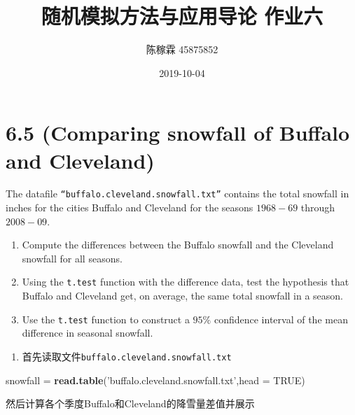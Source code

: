 \documentclass[]{article}
\title{随机模拟方法与应用导论 作业六}
\author{陈稼霖 45875852}
\date{2019-10-04}
\newenvironment{Shaded}{\begin{snugshade}}{\end{snugshade}}
\newcommand{\DataTypeTok}[1]{\textcolor[rgb]{0.13,0.29,0.53}{#1}}
\newcommand{\DecValTok}[1]{\textcolor[rgb]{0.00,0.00,0.81}{#1}}
\newcommand{\KeywordTok}[1]{\textcolor[rgb]{0.13,0.29,0.53}{\textbf{#1}}}
\newcommand{\NormalTok}[1]{#1}
\newcommand{\OperatorTok}[1]{\textcolor[rgb]{0.81,0.36,0.00}{\textbf{#1}}}
\newcommand{\OtherTok}[1]{\textcolor[rgb]{0.56,0.35,0.01}{#1}}
\newcommand{\StringTok}[1]{\textcolor[rgb]{0.31,0.60,0.02}{#1}}
\providecommand{\tightlist}{%
  \setlength{\itemsep}{0pt}\setlength{\parskip}{0pt}}
\begin{document}
\maketitle

\hypertarget{comparing-snowfall-of-buffalo-and-cleveland}{%
\section{6.5 (Comparing snowfall of Buffalo and
Cleveland)}\label{comparing-snowfall-of-buffalo-and-cleveland}}

The datafile \texttt{“buffalo.cleveland.snowfall.txt”} contains the
total snowfall in inches for the cities Buffalo and Cleveland for the
seasons \(1968-69\) through \(2008-09\).

\begin{enumerate}
\def\labelenumi{\alph{enumi}.}
\item
  Compute the differences between the Buffalo snowfall and the Cleveland
  snowfall for all seasons.
\item
  Using the \texttt{t.test} function with the difference data, test the
  hypothesis that Buffalo and Cleveland get, on average, the same total
  snowfall in a season.
\item
  Use the \texttt{t.test} function to construct a \(95\%\) confidence
  interval of the mean difference in seasonal snowfall.
\end{enumerate}

\begin{enumerate}
\def\labelenumi{\alph{enumi}.}
\tightlist
\item
  首先读取文件\texttt{buffalo.cleveland.snowfall.txt}
\end{enumerate}

\begin{Shaded}
\begin{Highlighting}[]
\NormalTok{snowfall =}\StringTok{ }\KeywordTok{read.table}\NormalTok{(}\StringTok{'buffalo.cleveland.snowfall.txt'}\NormalTok{,}\DataTypeTok{head =} \OtherTok{TRUE}\NormalTok{)}
\end{Highlighting}
\end{Shaded}

然后计算各个季度Buffalo和Cleveland的降雪量差值并展示

\begin{Shaded}
\end{Shaded}
\end{document}

